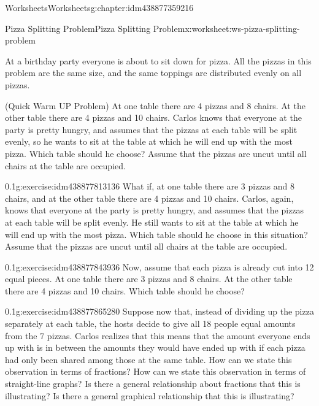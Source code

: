 \documentclass[twoside,11pt,]{book}
\begin{document}
\begin{chapterptx}{Worksheets}{}{Worksheets}{}{}{g:chapter:idm438877359216}
%
%
\typeout{************************************************}
\typeout{************************************************}
%
\begin{worksheet-section-numberless}{Pizza Splitting Problem}{}{Pizza Splitting Problem}{}{}{x:worksheet:ws-pizza-splitting-problem}
\begin{introduction}{}%
At a birthday party everyone is about to sit down for pizza.  All the pizzas in this problem are the same size, and the same toppings are distributed evenly on all pizzas.%
\end{introduction}%
(Quick Warm UP Problem) At one table there are 4 pizzas and 8 chairs.  At the other table there are 4 pizzas and 10 chairs.  Carlos knows that everyone at the party is pretty hungry, and assumes that the pizzas at each table will be split evenly, so he wants to sit at the table at which he will end up with the most pizza.  Which table should he choose?  Assume that the pizzas are uncut until all chairs at the table are occupied.%
\begin{divisionexercise}{1}{}{0.1}{g:exercise:idm438877813136}%
What if, at one table there are 3 pizzas and 8 chairs, and at the other table there are 4 pizzas and 10 chairs.  Carlos, again, knows that everyone at the party is pretty hungry, and assumes that the pizzas at each table will be split evenly.  He still wants to sit at the table at which he will end up with the most pizza.  Which table should he choose in this situation? Assume that the pizzas are uncut until all chairs at the table are occupied.%
\end{divisionexercise}%
\begin{divisionexercise}{2}{}{0.1}{g:exercise:idm438877843936}%
Now, assume that each pizza is already cut into 12 equal pieces. At one table there are 3 pizzas and 8 chairs.  At the other table there are 4 pizzas and 10 chairs.  Which table should he choose?%
\end{divisionexercise}%
\begin{divisionexercise}{3}{}{0.1}{g:exercise:idm438877865280}%
Suppose now that, instead of dividing up the pizza separately at each table, the hosts decide to give all 18 people equal amounts from the 7 pizzas.  Carlos realizes that this means that the amount everyone ends up with is in between the amounts they would have ended up with if each pizza had only been shared among those at the same table.  How can we state this observation in terms of fractions?  How can we state this observation in terms of straight-line graphs?  Is there a general relationship about fractions that this is illustrating?  Is there a general graphical relationship that this is illustrating?%

\end{divisionexercise}
\end{worksheet-section-numberless}
\end{chapterptx}
\end{document}

